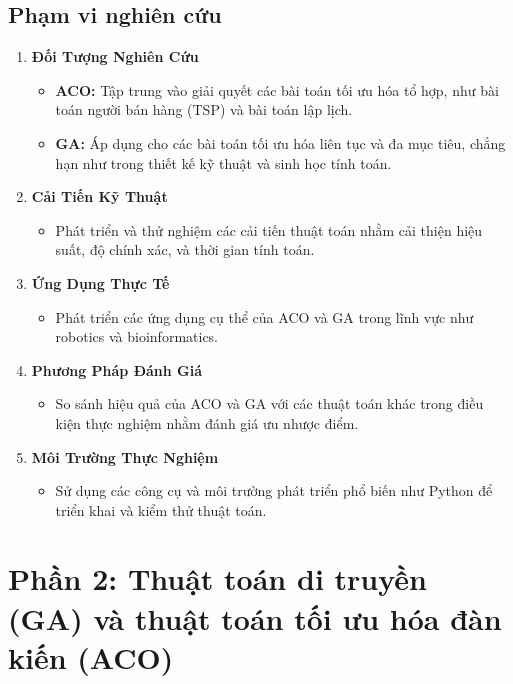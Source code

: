 \documentclass[14pt]{article}
\begin{document}
	\subsection{Phạm vi nghiên cứu}
	\begin{enumerate}
		\item \textbf{Đối Tượng Nghiên Cứu}
		\begin{itemize}
			\item \textbf{ACO:} Tập trung vào giải quyết các bài toán tối ưu hóa tổ hợp, như bài toán người bán hàng (TSP) và bài toán lập lịch.
			\item \textbf{GA:} Áp dụng cho các bài toán tối ưu hóa liên tục và đa mục tiêu, chẳng hạn như trong thiết kế kỹ thuật và sinh học tính toán.
		\end{itemize}
		\item \textbf{Cải Tiến Kỹ Thuật}
		\begin{itemize}
			\item Phát triển và thử nghiệm các cải tiến thuật toán nhằm cải thiện hiệu suất, độ chính xác, và thời gian tính toán.
		\end{itemize}
		\item \textbf{Ứng Dụng Thực Tế}
		\begin{itemize}
			\item Phát triển các ứng dụng cụ thể của ACO và GA trong lĩnh vực như robotics và bioinformatics.
		\end{itemize}
		\item \textbf{Phương Pháp Đánh Giá}
		\begin{itemize}
			\item So sánh hiệu quả của ACO và GA với các thuật toán khác trong điều kiện thực nghiệm nhằm đánh giá ưu nhược điểm.
		\end{itemize}
		\item \textbf{Môi Trường Thực Nghiệm}
		\begin{itemize}
			\item Sử dụng các công cụ và môi trường phát triển phổ biến như Python để triển khai và kiểm thử thuật toán.
		\end{itemize}
	\end{enumerate}
	\newpage
	
	\section{Phần 2: Thuật toán di truyền (GA) và thuật toán tối ưu hóa đàn kiến (ACO)}
\end{document}
